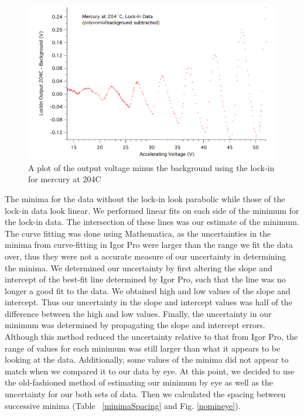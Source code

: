 \documentclass[prb,preprint]{revtex4-1}
\begin{document}
\begin{figure}[h!]
\centering
\includegraphics[width=6in]{204C_lockin_noback.png}
\caption{A plot of the output voltage minus the background using the lock-in for mercury at 204\degree C}
\label{nobacklock}
\end{figure}

The minima for the data without the lock-in look parabolic while those of the lock-in data look linear.
We performed linear fits on each side of the minimum for the lock-in data. The intersection of these lines was our estimate of the minimum.
The curve fitting was done using Mathematica, as the uncertainties in the minima from curve-fitting in Igor Pro were larger than the range we fit the data over, thus they were not a accurate measure of our uncertainty in determining the minima.
We determined our uncertainty by first altering the slope and intercept of the best-fit line determined by Igor Pro, such that the line was no longer a good fit to the data. We obtained high and low values of the slope and intercept. 
Thus our uncertainty in the slope and intercept values was half of the difference between the high and low values.
Finally, the uncertainty in our minimum was determined by propagating the slope and intercept errors.
Although this method reduced the uncertainty relative to that from Igor Pro,  the range of values for each minimum was still larger than what it appears to be looking at the data. Additionally, some values of the minima did not appear to match when we compared it to our data by eye.
At this point, we decided to use the old-fashioned method of estimating our minimum by eye as well as the uncertainty for our both sets of data. Then we calculated the spacing between successive minima (Table ~\ref{minimaSpacing} and Fig. \ref{nomineye}). 
\end{document}
